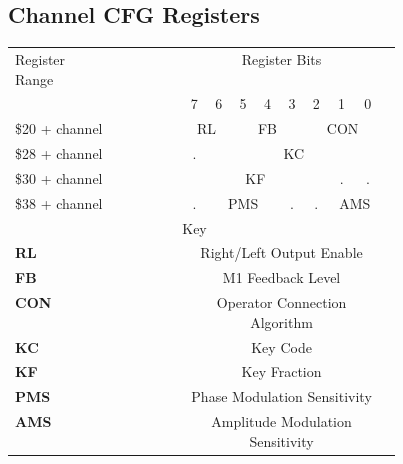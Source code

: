 \subsection{Channel CFG Registers}

\begin{tabular}{|m{0.45\linewidth}|c|c|c|c|c|c|c|c|c|}
	\hline

	\multirowcell{2}{Register\\Range}&\multicolumn{8}{c|}{Register Bits} \\\cline{2-9}
	& 7 & 6 & 5 & 4 & 3 & 2 & 1 & 0 \\ \hline

	\$20 + channel & \multicolumn{2}{c|}{RL} & \multicolumn{3}{c|}{FB} & \multicolumn{3}{c|}{CON} \\\cline{1-9}

	\$28 + channel & . & \multicolumn{7}{c|}{KC} \\\cline{1-9}
	\$30 + channel & \multicolumn{6}{c|}{KF} & . & . \\\cline{1-9}
	\$38 + channel & . & \multicolumn{3}{c|}{PMS} & . & . & \multicolumn{2}{c|}{AMS} \\\cline{1-9}

	\multicolumn{9}{|c|}{Key} \\ \hline
	
	{\bfseries RL} & \multicolumn{8}{c|}{Right/Left Output Enable}\\\hline
	{\bfseries FB} &  \multicolumn{8}{c|}{M1 Feedback Level}\\\hline
	{\bfseries CON} &  \multicolumn{8}{c|}{Operator Connection Algorithm}\\\hline
	{\bfseries KC} & \multicolumn{8}{c|}{Key Code}\\\hline
	{\bfseries KF} & \multicolumn{8}{c|}{Key Fraction}\\\hline
	{\bfseries PMS} & \multicolumn{8}{c|}{Phase Modulation Sensitivity}\\\hline
	{\bfseries AMS} & \multicolumn{8}{c|}{Amplitude Modulation Sensitivity}\\\hline

\end{tabular}
% 
